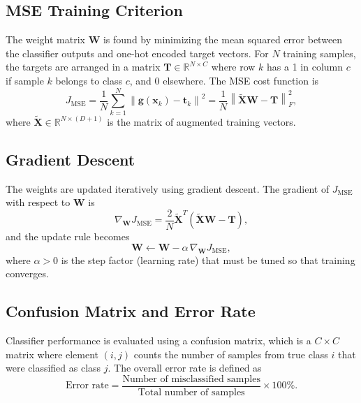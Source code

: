 \documentclass[11pt,a4paper]{article}
\begin{document}
\subsection{MSE Training Criterion}

The weight matrix $\mathbf{W}$ is found by minimizing the mean squared error between the classifier outputs and one-hot encoded target vectors. For $N$ training samples, the targets are arranged in a matrix $\mathbf{T} \in \mathbb{R}^{N \times C}$ where row $k$ has a 1 in column $c$ if sample $k$ belongs to class $c$, and 0 elsewhere. The MSE cost function is
\begin{equation}
    J_{\text{MSE}} = \frac{1}{N} \sum_{k=1}^{N} \left\| \mathbf{g}(\mathbf{x}_k) - \mathbf{t}_k \right\|^2 = \frac{1}{N} \left\| \tilde{\mathbf{X}} \mathbf{W} - \mathbf{T} \right\|_F^2,
    \label{eq:mse}
\end{equation}
where $\tilde{\mathbf{X}} \in \mathbb{R}^{N \times (D+1)}$ is the matrix of augmented training vectors.

\subsection{Gradient Descent}

The weights are updated iteratively using gradient descent. The gradient of $J_{\text{MSE}}$ with respect to $\mathbf{W}$ is
\begin{equation}
    \nabla_{\mathbf{W}} J_{\text{MSE}} = \frac{2}{N} \tilde{\mathbf{X}}^T \left( \tilde{\mathbf{X}} \mathbf{W} - \mathbf{T} \right),
    \label{eq:gradient}
\end{equation}
and the update rule becomes
\begin{equation}
    \mathbf{W} \leftarrow \mathbf{W} - \alpha \, \nabla_{\mathbf{W}} J_{\text{MSE}},
    \label{eq:update}
\end{equation}
where $\alpha > 0$ is the step factor (learning rate) that must be tuned so that training converges.

\subsection{Confusion Matrix and Error Rate}

Classifier performance is evaluated using a confusion matrix, which is a $C \times C$ matrix where element $(i,j)$ counts the number of samples from true class $i$ that were classified as class $j$. The overall error rate is defined as
\begin{equation}
    \text{Error rate} = \frac{\text{Number of misclassified samples}}{\text{Total number of samples}} \times 100\%.
    \label{eq:errorrate}
\end{equation}
\end{document}

